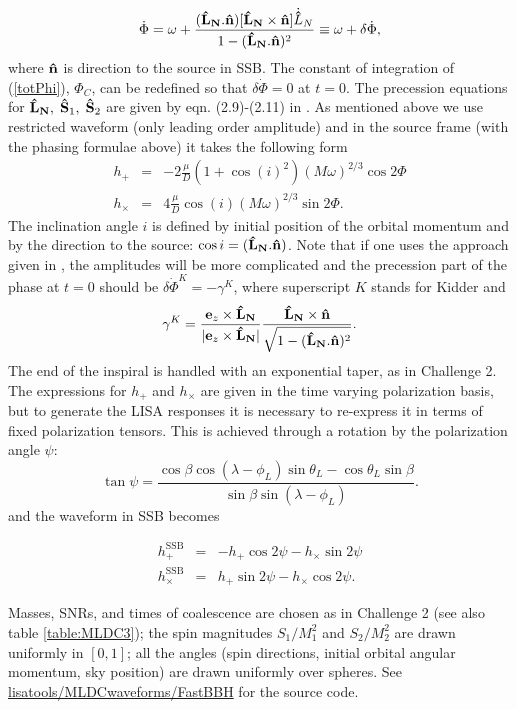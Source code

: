 \documentclass{iopart}
\def\bL{{\bf \hat{L}_{N}}}
\def\hn{{\bf {\hat n}}}
\begin{document}
\begin{equation}
\dot{\Phi} = \omega + \frac{(\bL.\hn)[\bL\times \hn]\dot{\bf \hat{L}}_N}{1-(\bL.\hn)^2}
\equiv \omega + \delta\dot{\Phi},\label{totPhi}
\end{equation}
where $\hn$ is direction to the source in SSB. The constant of integration of (\ref{totPhi}),
 $\Phi_C$,  can be redefined so that $\delta\dot{\Phi} = 0$ at $t=0$.  The precession  
 equations for $\bL, \; {\bf \hat{S}}_1,\;{\bf \hat{S}}_2$ are given by eqn. (2.9)-(2.11) in 
 \cite{LangHughes}. As mentioned above we use restricted waveform (only leading order amplitude) and in the source frame (with the phasing formulae above) it takes the following form 
 \begin{eqnarray}
h_{+} &=& -2\frac{\mu}{D}(1 + \cos(i)^2)(M\omega)^{2/3}\cos{2\Phi}\\
h_{\times} &=& 4\frac{\mu}{D}\cos(i)(M\omega)^{2/3}\sin{2\Phi}.
\end{eqnarray}
The inclination angle $i$ is defined by initial position of the orbital momentum and 
by the direction to the source: $\cos{i} = (\bL.\hn)$.
Note that if one uses the approach given in \cite{Kidder}, the amplitudes will be more complicated
and the precession part of the phase at $t=0$ should be $\delta\dot{\Phi}^K = -\gamma^K$,
where superscript $K$ stands for Kidder and 
$$
\gamma^K = \frac{{\bf e}_z \times \bL}{|{\bf e}_z \times \bL|}\frac{\bL\times \hn}
{\sqrt{1 - (\bL.\hn)^2}}.
$$
The end of the inspiral is handled with an exponential taper, as in Challenge 2. The expressions 
for $h_{+}$ and $h_{\times}$ are given in the time varying polarization basis, but to generate the LISA responses it is necessary to re-express it in terms
of fixed polarization tensors. This is achieved through a rotation by the polarization
angle $\psi$:
\begin{equation}
\tan{\psi} = \frac{\cos{\beta}\cos{(\lambda -\phi_L)}\sin{\theta_L} - \cos{\theta_L}\sin{\beta}}
{\sin{\beta}\sin{(\lambda - \phi_L)}}.
\end{equation}
and the waveform in SSB becomes

\begin{eqnarray}
h_{+}^\mathrm{SSB} &=& -h_{+}\cos{2\psi} - h_{\times}\sin{2\psi}\\
h_{\times}^\mathrm{SSB} &=& h_{+}\sin{2\psi} - h_{\times}\cos{2\psi}.
\end{eqnarray}

Masses, SNRs, and times of coalescence are chosen as in Challenge 2 (see also table \ref{table:MLDC3}); the spin magnitudes $S_1/M_1^2$ and $S_2/M_2^2$
are drawn uniformly in $[0,1]$; all the angles (spin directions, initial orbital angular momentum, sky position) are drawn uniformly over spheres. See \url{lisatools/MLDCwaveforms/FastBBH} for the source code.
\end{document}
